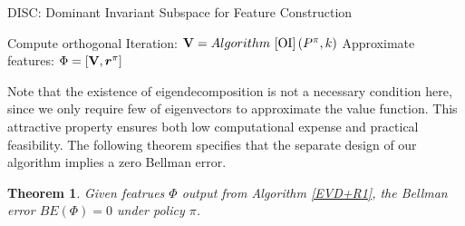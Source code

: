 \documentclass[onecolumn, conference]{IEEEtran}
\newtheorem{theorem}{\textbf{Theorem}}
\begin{document}
\begin{algorithm}[H]
        \caption{DISC: Dominant Invariant Subspace for Feature Construction\label{EVD+R1}}
        Compute orthogonal Iteration: ${\bf V} = Algorithm~{\ref{OI}}\left(P^\pi, k\right)$\;
        Approximate features: $\Phi = [{\bf V}, \boldsymbol{r}^\pi ]$\;
\end{algorithm}
Note that the existence of eigendecomposition is not a necessary condition here, since we only require few of eigenvectors to approximate the value function. This attractive property ensures both low computational expense and practical feasibility. The following theorem specifies that the separate design of our algorithm implies a zero Bellman error. 
\begin{theorem}\label{theorem:tabular}
Given featrues $\Phi$ output from Algorithm \ref{EVD+R1}, the Bellman error $BE(\Phi)=0$ under policy $\pi$. 
\end{theorem}
\end{document}
